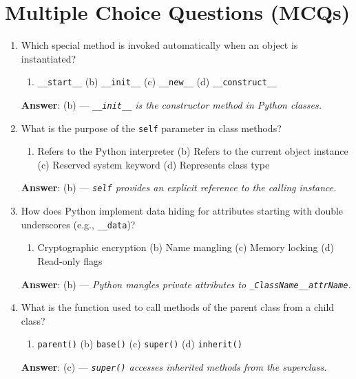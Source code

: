 \section{Multiple Choice Questions (MCQs)}

\begin{enumerate}[leftmargin=1.5em]
    \item Which special method is invoked automatically when an object is instantiated?
    \begin{enumerate}[label=(\alph*)]
        \item \texttt{\_\_start\_\_} \quad (b) \texttt{\_\_init\_\_} \quad (c) \texttt{\_\_new\_\_} \quad (d) \texttt{\_\_construct\_\_}
    \end{enumerate}
    \textbf{Answer}: (b) --- \textit{\texttt{\_\_init\_\_} is the constructor method in Python classes.}

    \item What is the purpose of the \texttt{self} parameter in class methods?
    \begin{enumerate}[label=(\alph*)]
        \item Refers to the Python interpreter \quad (b) Refers to the current object instance \quad (c) Reserved system keyword \quad (d) Represents class type
    \end{enumerate}
    \textbf{Answer}: (b) --- \textit{\texttt{self} provides an explicit reference to the calling instance.}

    \item How does Python implement data hiding for attributes starting with double underscores (e.g., \texttt{\_\_data})?
    \begin{enumerate}[label=(\alph*)]
        \item Cryptographic encryption \quad (b) Name mangling \quad (c) Memory locking \quad (d) Read-only flags
    \end{enumerate}
    \textbf{Answer}: (b) --- \textit{Python mangles private attributes to \texttt{\_ClassName\_\_attrName}.}

    \item What is the function used to call methods of the parent class from a child class?
    \begin{enumerate}[label=(\alph*)]
        \item \texttt{parent()} \quad (b) \texttt{base()} \quad (c) \texttt{super()} \quad (d) \texttt{inherit()}
    \end{enumerate}
    \textbf{Answer}: (c) --- \textit{\texttt{super()} accesses inherited methods from the superclass.}


\end{enumerate}

